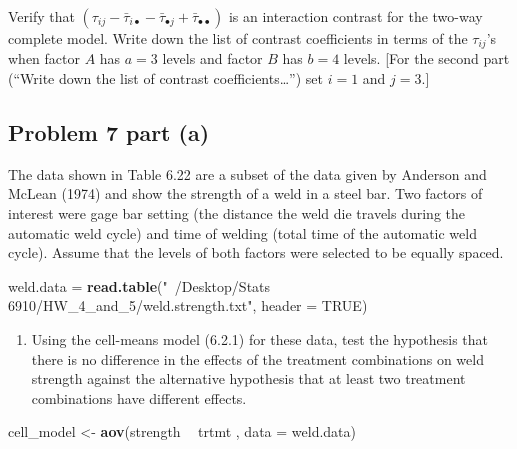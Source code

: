 \documentclass[12pt,]{article}
\newenvironment{Shaded}{\begin{snugshade}}{\end{snugshade}}
\newcommand{\KeywordTok}[1]{\textcolor[rgb]{0.13,0.29,0.53}{\textbf{#1}}}
\newcommand{\DataTypeTok}[1]{\textcolor[rgb]{0.13,0.29,0.53}{#1}}
\newcommand{\StringTok}[1]{\textcolor[rgb]{0.31,0.60,0.02}{#1}}
\newcommand{\OtherTok}[1]{\textcolor[rgb]{0.56,0.35,0.01}{#1}}
\newcommand{\OperatorTok}[1]{\textcolor[rgb]{0.81,0.36,0.00}{\textbf{#1}}}
\newcommand{\NormalTok}[1]{#1}
\providecommand{\tightlist}{%
  \setlength{\itemsep}{0pt}\setlength{\parskip}{0pt}}
\begin{document}
Verify that
\((\tau_{ij} - \bar{\tau}_{i\bullet} - \bar{\tau}_{\bullet j} + \bar{\tau}_{\bullet \bullet})\)
is an interaction contrast for the two-way complete model. Write down
the list of contrast coefficients in terms of the \(\tau_{ij}\)'s when
factor \(A\) has \(a = 3\) levels and factor \(B\) has \(b=4\) levels.
{[}For the second part (``Write down the list of contrast
coefficients\ldots{}'') set \(i=1\) and \(j = 3\).{]}

\subsection{Problem 7 part (a)}\label{problem-7-part-a}

The data shown in Table 6.22 are a subset of the data given by Anderson
and McLean (1974) and show the strength of a weld in a steel bar. Two
factors of interest were gage bar setting (the distance the weld die
travels during the automatic weld cycle) and time of welding (total time
of the automatic weld cycle). Assume that the levels of both factors
were selected to be equally spaced.

\begin{Shaded}
\begin{Highlighting}[]
\NormalTok{weld.data =}\StringTok{ }\KeywordTok{read.table}\NormalTok{(}\StringTok{"~/Desktop/Stats 6910/HW_4_and_5/weld.strength.txt"}\NormalTok{, }
                            \DataTypeTok{header =} \OtherTok{TRUE}\NormalTok{)}
\end{Highlighting}
\end{Shaded}

\begin{enumerate}
\def\labelenumi{(\alph{enumi})}
\tightlist
\item
  Using the cell-means model (6.2.1) for these data, test the hypothesis
  that there is no difference in the effects of the treatment
  combinations on weld strength against the alternative hypothesis that
  at least two treatment combinations have different effects.
\end{enumerate}

\begin{Shaded}
\begin{Highlighting}[]
\NormalTok{cell_model <-}\StringTok{ }\KeywordTok{aov}\NormalTok{(strength }\OperatorTok{~}\StringTok{ }\NormalTok{trtmt , }\DataTypeTok{data =}\NormalTok{ weld.data)}
\end{Highlighting}
\end{Shaded}
\end{document}
